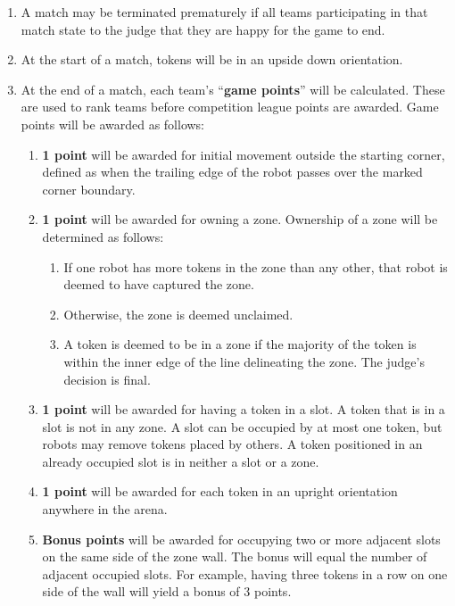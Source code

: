 \begin{enumerate}
\item A match may be terminated prematurely if all teams participating in that match state to the judge that they are happy for the game to end.

\item At the start of a match, tokens will be in an upside down orientation.

\item At the end of a match, each team's ``\textbf{game points}'' will be calculated.
      These are used to rank teams before competition league points are awarded.
      Game points will be awarded as follows:

\begin{enumerate}
  \item \textbf{1 point} will be awarded for initial movement outside the starting corner,
        defined as when the trailing edge of the robot passes over the marked corner boundary.

  \item \textbf{1 point} will be awarded for owning a zone.
    Ownership of a zone will be determined as follows:
    \begin{enumerate}
      \item If one robot has more tokens in the zone than any other, that robot is deemed to have captured the zone.
      \item Otherwise, the zone is deemed unclaimed.
      \item A token is deemed to be in a zone if the majority of the token is within the inner edge of the line delineating the zone.
            The judge's decision is final.
    \end{enumerate}

  \item \textbf{1 point} will be awarded for having a token in a slot.
        A token that is in a slot is not in any zone.
        A slot can be occupied by at most one token, but robots may remove tokens placed by others.
        A token positioned in an already occupied slot is in neither a slot or a zone.

  \item \textbf{1 point} will be awarded for each token in an upright orientation anywhere in the arena.

  \item \textbf{Bonus  points} will be awarded for occupying two or more adjacent slots on the same side of the zone wall.
        The bonus will equal the number of adjacent occupied slots.
        For example, having three tokens in a row on one side of the wall will yield a bonus of 3 points.
\end{enumerate}


\end{enumerate}
